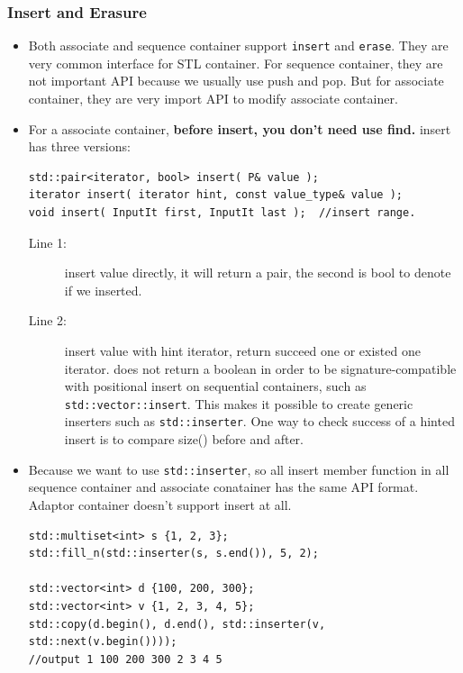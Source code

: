\documentclass[a4paper,11pt,twoside]{book}
\begin{document}
\subsubsection{Insert and Erasure}
\begin{itemize}
\item Both associate and sequence container support \texttt{insert} and \texttt{erase}. They are very common interface for STL container. For sequence container, they are not important API because we usually use push and pop. But for associate container, they are very import API to modify associate container. 

\item For a associate container, \textbf{before insert, you don't need use find.} insert has three versions:
\begin{lstlisting}[numbers=none]
std::pair<iterator, bool> insert( P& value ); 
iterator insert( iterator hint, const value_type& value );
void insert( InputIt first, InputIt last );  //insert range.
\end{lstlisting}
\begin{description}
	\item[Line 1:] insert value directly, it will return a pair, the second is bool to denote if we inserted.
	
	\item[Line 2:] insert value with hint iterator, return succeed one or existed one iterator. does not return a boolean in order to be signature-compatible with positional insert on sequential containers, such as \texttt{std::vector::insert}. This makes it possible to create generic inserters such as \texttt{std::inserter}. One way to check success of a hinted insert is to compare size() before and after. 
\end{description}

\item Because we want to use \texttt{std::inserter}, so all insert member function in all sequence container and associate conatainer has the same API format. Adaptor container doesn't support insert at all. 
\begin{lstlisting}[numbers=none]
std::multiset<int> s {1, 2, 3};
std::fill_n(std::inserter(s, s.end()), 5, 2);	

std::vector<int> d {100, 200, 300};
std::vector<int> v {1, 2, 3, 4, 5};
std::copy(d.begin(), d.end(), std::inserter(v, std::next(v.begin())));
//output 1 100 200 300 2 3 4 5
\end{lstlisting}


\end{itemize}
\end{document}
